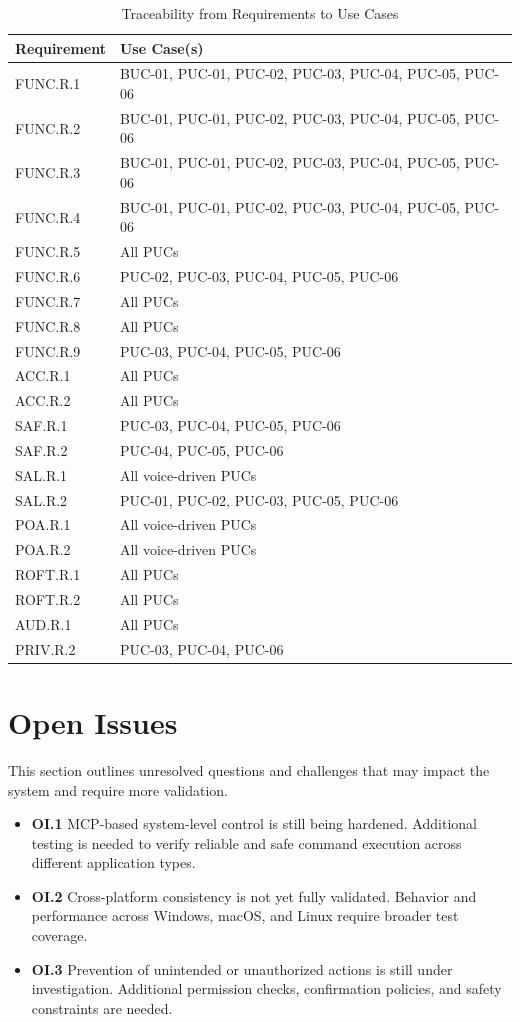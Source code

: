 \documentclass[12pt]{article}
\begin{document}
\begin{table}[H]
\centering
\caption{Traceability from Requirements to Use Cases}
\label{tab:req-to-uc}
\begin{tabularx}{\textwidth}{p{3.2cm}X}
\toprule
\textbf{Requirement} & \textbf{Use Case(s)} \\
\midrule
FUNC.R.1 & BUC-01, PUC-01, PUC-02, PUC-03, PUC-04, PUC-05, PUC-06 \\
FUNC.R.2 & BUC-01, PUC-01, PUC-02, PUC-03, PUC-04, PUC-05, PUC-06 \\
FUNC.R.3 & BUC-01, PUC-01, PUC-02, PUC-03, PUC-04, PUC-05, PUC-06 \\
FUNC.R.4 & BUC-01, PUC-01, PUC-02, PUC-03, PUC-04, PUC-05, PUC-06 \\
FUNC.R.5 & All PUCs \\
FUNC.R.6 & PUC-02, PUC-03, PUC-04, PUC-05, PUC-06 \\
FUNC.R.7 & All PUCs \\
FUNC.R.8 & All PUCs \\
FUNC.R.9 & PUC-03, PUC-04, PUC-05, PUC-06 \\
ACC.R.1 & All PUCs \\
ACC.R.2 & All PUCs \\
SAF.R.1 & PUC-03, PUC-04, PUC-05, PUC-06 \\
SAF.R.2 & PUC-04, PUC-05, PUC-06 \\
SAL.R.1 & All voice-driven PUCs \\
SAL.R.2 & PUC-01, PUC-02, PUC-03, PUC-05, PUC-06 \\
POA.R.1 & All voice-driven PUCs \\
POA.R.2 & All voice-driven PUCs \\
ROFT.R.1 & All PUCs \\
ROFT.R.2 & All PUCs \\
AUD.R.1 & All PUCs \\
PRIV.R.2 & PUC-03, PUC-04, PUC-06 \\
\bottomrule
\end{tabularx}
\end{table}

\section{Open Issues}
This section outlines unresolved questions and challenges that may
impact the system and require more validation.

\begin{itemize}
  \item \textbf{OI.1} MCP-based system-level control is still being
  hardened. Additional testing is needed to verify reliable and safe
  command execution across different application types.
  \item \textbf{OI.2} Cross-platform consistency is not yet fully
  validated. Behavior and performance across Windows, macOS, and Linux
  require broader test coverage.
  \item \textbf{OI.3} Prevention of unintended or unauthorized actions
  is still under investigation. Additional permission checks,
  confirmation policies, and safety constraints are needed.
\end{itemize}
\end{document}
